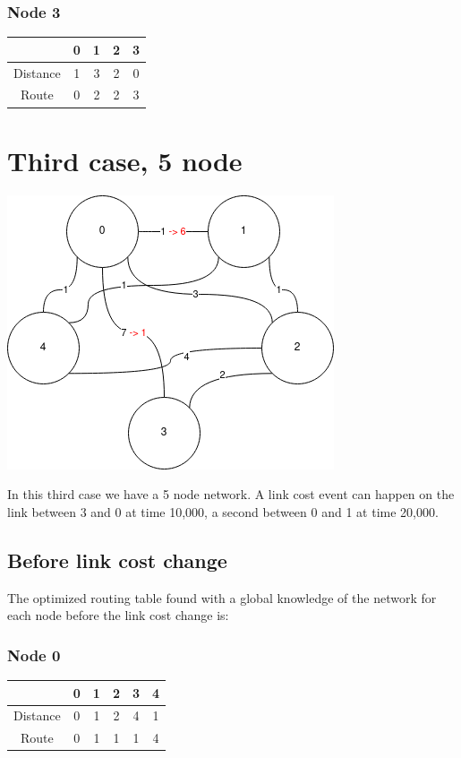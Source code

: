 \documentclass[a4paper,11pt,final]{report}
\begin{document}
\subsubsection{Node 3}

\begin{tabular}{|c|c|c|c|c|}
\hline
& 0 & 1 & 2 & 3 \\ \hline
Distance & 1 & 3 & 2 & 0 \\ \hline
Route & 0 & 2 & 2 & 3 \\ \hline
\end{tabular}

\section{Third case, 5 node}

\includegraphics{upload_ce8d2ba305cfd6dabce57e6ab21a2259.png}

In this third case we have a 5 node network. A link cost event can
happen on the link between 3 and 0 at time 10,000, a second between 0
and 1 at time 20,000.

\subsection{Before link cost change}

The optimized routing table found with a global knowledge of the network
for each node before the link cost change is:

\subsubsection{Node 0}

\begin{tabular}{|c|c|c|c|c|c|}
\hline
& 0 & 1 & 2 & 3 & 4 \\ \hline
Distance & 0 & 1 & 2 & 4 & 1 \\ \hline
Route & 0 & 1 & 1 & 1 & 4 \\ \hline
\end{tabular}
\end{document}
